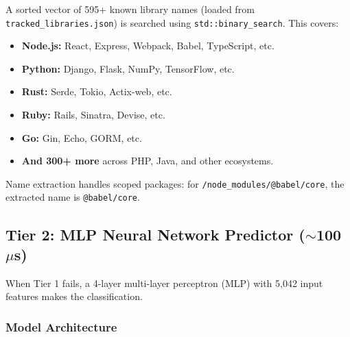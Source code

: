 \documentclass[12pt, a4paper]{article}
\begin{document}
A sorted vector of 595+ known library names (loaded from \texttt{tracked\_libraries.json}) is searched using \texttt{std::binary\_search}. This covers:

\begin{itemize}
  \item \textbf{Node.js:} React, Express, Webpack, Babel, TypeScript, etc.
  \item \textbf{Python:} Django, Flask, NumPy, TensorFlow, etc.
  \item \textbf{Rust:} Serde, Tokio, Actix-web, etc.
  \item \textbf{Ruby:} Rails, Sinatra, Devise, etc.
  \item \textbf{Go:} Gin, Echo, GORM, etc.
  \item \textbf{And 300+ more} across PHP, Java, and other ecosystems.
\end{itemize}

Name extraction handles scoped packages: for \texttt{/node\_modules/@babel/core}, the extracted name is \texttt{@babel/core}.

\subsection{Tier 2: MLP Neural Network Predictor ($\sim$100\,$\mu$s)}

When Tier 1 fails, a 4-layer multi-layer perceptron (MLP) with 5,042 input features makes the classification.

\subsubsection{Model Architecture}
\end{document}
